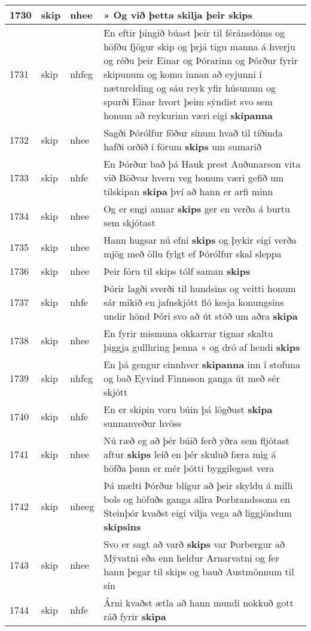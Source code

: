 \documentclass{article}
\begin{document}
\begin{longtable}{p{1cm}|p{1cm}|p{1cm}|p{13cm}}
\hline
1730&skip&nhee&» Og við þetta skilja þeir \textbf{skips} \\
\hline
1731&skip&nhfeg&En eftir þingið búast þeir til féránsdóms og höfðu fjögur skip og þrjá tigu manna á hverju og réðu þeir Einar og Þórarinn og Þórður fyrir skipunum og komu innan að eyjunni í næturelding og sáu reyk yfir húsunum og spurði Einar hvort þeim sýndist svo sem honum að reykurinn væri eigi \textbf{skipanna} \\
\hline
1732&skip&nhee&Sagði Þórólfur föður sínum hvað til tíðinda hafði orðið í förum \textbf{skips} um sumarið\\
\hline
1733&skip&nhfe&En Þórður bað þá Hauk prest Auðunarson vita við Böðvar hvern veg honum væri gefið um tilskipan \textbf{skipa} því að hann er arfi minn\\
\hline
1734&skip&nhee&Og er engi annar \textbf{skips} ger en verða á burtu sem skjótast\\
\hline
1735&skip&nhee&Hann hugsar nú efni \textbf{skips} og þykir eigi verða mjög með öllu fylgt ef Þórólfur skal sleppa\\
\hline
1736&skip&nhee&Þeir fóru til skips tólf saman \textbf{skips} \\
\hline
1737&skip&nhfe&Þórir lagði sverði til hundsins og veitti honum sár mikið en jafnskjótt fló kesja konungsins undir hönd Þóri svo að út stóð um aðra \textbf{skipa} \\
\hline
1738&skip&nhee&En fyrir mismuna okkarrar tignar skaltu þiggja gullhring þenna » og dró af hendi \textbf{skips} \\
\hline
1739&skip&nhfeg&En þá gengur einnhver \textbf{skipanna} inn í stofuna og bað Eyvind Finnsson ganga út með sér skjótt\\
\hline
1740&skip&nhfe&En er skipin voru búin þá lögðust \textbf{skipa} sunnanveður hvöss\\
\hline
1741&skip&nhee&Nú ræð eg að þér búið ferð yðra sem fljótast aftur \textbf{skips} leið en þér skuluð færa mig á höfða þann er mér þótti byggilegast vera\\
\hline
1742&skip&nheeg&Þá mælti Þórður blígur að þeir skyldu á milli bols og höfuðs ganga allra Þorbrandssona en Steinþór kvaðst eigi vilja vega að liggjöndum \textbf{skipsins} \\
\hline
1743&skip&nhee&Svo er sagt að varð \textbf{skips} var Þorbergur að Mývatni eða enn heldur Arnarvatni og fer hann þegar til skips og bauð Austmönnum til sín\\
\hline
1744&skip&nhfe&Árni kvaðst ætla að hann mundi nokkuð gott ráð fyrir \textbf{skipa} \\

\end{longtable}
\end{document}
